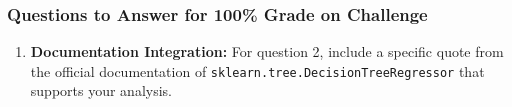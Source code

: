 \documentclass[
  letterpaper,
  DIV=11,
  numbers=noendperiod]{scrartcl}
\providecommand{\tightlist}{%
  \setlength{\itemsep}{0pt}\setlength{\parskip}{0pt}}
\begin{document}
\subsubsection{Questions to Answer for 100\% Grade on
Challenge}\label{questions-to-answer-for-100-grade-on-challenge}

\begin{enumerate}
\def\labelenumi{\arabic{enumi}.}
\setcounter{enumi}{3}
\tightlist
\item
  \textbf{Documentation Integration:} For question 2, include a specific
  quote from the official documentation of
  \texttt{sklearn.tree.DecisionTreeRegressor} that supports your
  analysis.
\end{enumerate}
\end{document}
